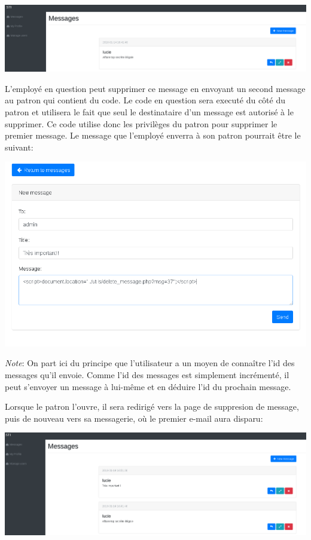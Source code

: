 \documentclass{article}
\begin{document}
\includegraphics{images/delete1.PNG}

L'employé en question peut supprimer ce message en envoyant un second
message au patron qui contient du code. Le code en question sera executé
du côté du patron et utilisera le fait que seul le destinataire d'un
message est autorisé à le supprimer. Ce code utilise donc les privilèges
du patron pour supprimer le premier message. Le message que l'employé
enverra à son patron pourrait être le suivant:

\includegraphics{images/delete2.PNG}

\emph{Note}: On part ici du principe que l'utilisateur a un moyen de
connaître l'id des messages qu'il envoie. Comme l'id des messages est
simplement incrémenté, il peut s'envoyer un message à lui-même et en
déduire l'id du prochain message.

Lorsque le patron l'ouvre, il sera redirigé vers la page de suppresion
de message, puis de nouveau vers sa messagerie, où le premier e-mail
aura disparu:

\includegraphics{images/delete3.PNG}
\end{document}
